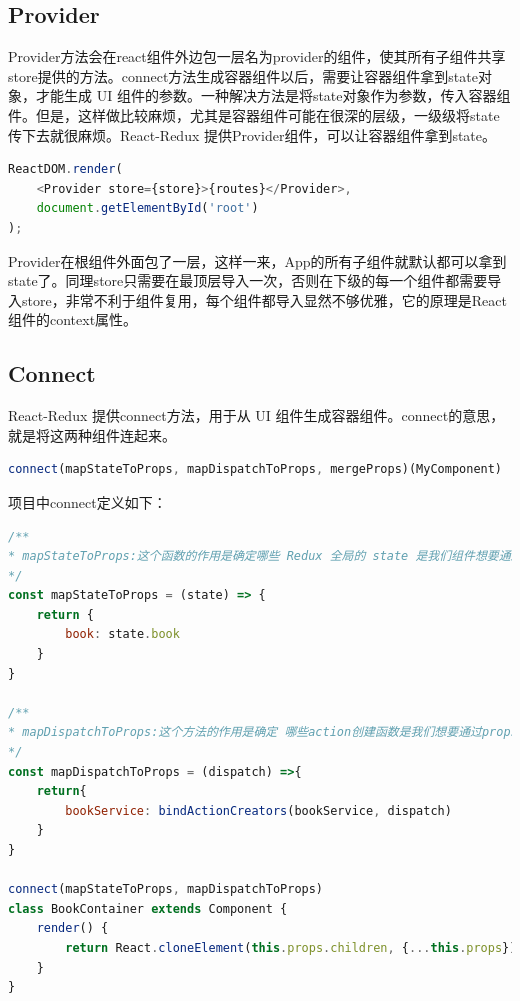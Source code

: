 \documentclass[letter]{book}
\begin{document}
\subsection{Provider}

Provider方法会在react组件外边包一层名为provider的组件，使其所有子组件共享store提供的方法。connect方法生成容器组件以后，需要让容器组件拿到state对象，才能生成 UI 组件的参数。一种解决方法是将state对象作为参数，传入容器组件。但是，这样做比较麻烦，尤其是容器组件可能在很深的层级，一级级将state传下去就很麻烦。React-Redux 提供Provider组件，可以让容器组件拿到state。

\begin{lstlisting}[language=Javascript]
ReactDOM.render(
	<Provider store={store}>{routes}</Provider>,
	document.getElementById('root')
);
\end{lstlisting}

Provider在根组件外面包了一层，这样一来，App的所有子组件就默认都可以拿到state了。同理store只需要在最顶层导入一次，否则在下级的每一个组件都需要导入store，非常不利于组件复用，每个组件都导入显然不够优雅，它的原理是React组件的context属性。

\subsection{Connect}

React-Redux 提供connect方法，用于从 UI 组件生成容器组件。connect的意思，就是将这两种组件连起来。

\begin{lstlisting}[language=Javascript]
connect(mapStateToProps, mapDispatchToProps, mergeProps)(MyComponent)
\end{lstlisting}

项目中connect定义如下：

\begin{lstlisting}[language=Javascript]
/**
* mapStateToProps:这个函数的作用是确定哪些 Redux 全局的 state 是我们组件想要通过 props 获取
*/
const mapStateToProps = (state) => {
	return {
		book: state.book
	}
}

/**
* mapDispatchToProps:这个方法的作用是确定 哪些action创建函数是我们想要通过props获取
*/
const mapDispatchToProps = (dispatch) =>{
	return{
		bookService: bindActionCreators(bookService, dispatch)
	}
}

connect(mapStateToProps, mapDispatchToProps)
class BookContainer extends Component {
	render() {
		return React.cloneElement(this.props.children, {...this.props});
	}
}
\end{lstlisting}
\end{document}
